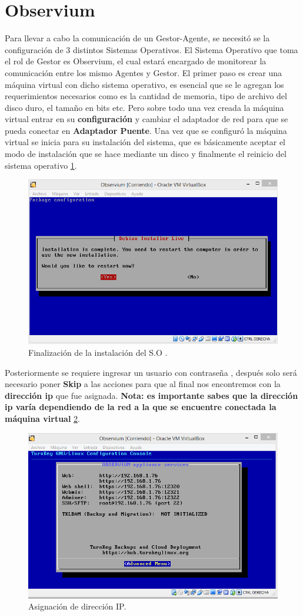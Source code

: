 \section{Observium}

Para llevar a cabo la comunicación de un Gestor-Agente, se necesitó se la configuración de 3 distintos Sistemas Operativos. 
El Sistema Operativo que toma el rol de Gestor es Observium, el cual estará encargado de monitorear la comunicación entre los mismo Agentes y Gestor. El primer paso es crear una máquina virtual con dicho sistema operativo, es esencial que se le agregan los requerimientos necesarios como es la cantidad de memoria, tipo de archivo del disco duro, el tamaño en bits etc. Pero sobre todo una vez creada la máquina virtual entrar en su \textbf{configuración} y cambiar el adaptador de red para que se pueda conectar en \textbf{Adaptador Puente}.
Una vez que se configuró la máquina virtual se inicia para su instalación del sistema, que es básicamente aceptar el modo de instalación que se hace mediante un disco y finalmente el reinicio del sistema operativo \ref{image:fin}.

\FloatBarrier
\begin{figure}[htbp!]
		\centering
		    \includegraphics[width=.5 \textwidth]{../images/1-Observium.png}
		\caption{Finalización de la instalación del S.O .}
		\label{image:fin}
\end{figure}
\FloatBarrier

Posteriormente se requiere ingresar un usuario con contraseña , después solo será necesario poner  \textbf{Skip} a las acciones para que al final nos encontremos con la  \textbf{dirección ip} que fue asignada.
 \textbf{Nota: es importante sabes que la dirección ip varía dependiendo de la red a la que se encuentre conectada la máquina virtual} \ref{image:ip}.

\FloatBarrier
\begin{figure}[htbp!]
		\centering
		    \includegraphics[width=.5 \textwidth]{../images/2-Observium.png} 
		\caption{Asignación de dirección IP.}
		\label{image:ip}
\end{figure}
\FloatBarrier

